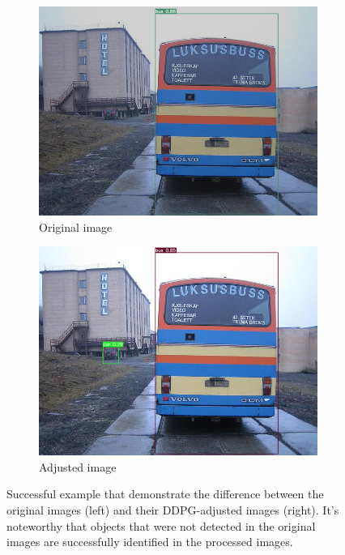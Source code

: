 \documentclass{PHlab-thesis}
\begin{document}
\begin{figure}[H]
    \begin{subfigure}{0.45\textwidth}
        \centering
        \includegraphics[width=\textwidth]{images/instances/original_image_3.png}
        \caption{Original image}
    \end{subfigure}
    \quad
    \begin{subfigure}{0.45\textwidth}
        \centering
        \includegraphics[width=\textwidth]{images/instances/adjusted_image_3.png}
        \caption{Adjusted image}
    \end{subfigure}
    \caption[Successful example with DDPG adjustments]{Successful example that demonstrate the difference between the original images (left) and their DDPG-adjusted images (right). It's noteworthy that objects that were not detected in the original images are successfully identified in the processed images.}
\end{figure}
\end{document}
